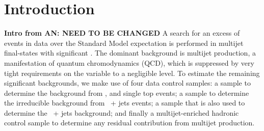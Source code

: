 \clearpage
\section{Introduction\label{sec:intro}}


%
\textbf{Intro from AN: NEED TO BE CHANGED}
A search for an excess of events in data over the Standard Model
expectation is performed in multijet final-states with significant
\met. The dominant background is multijet production, a manifestation
of quantum chromodynamics (QCD), which is suppressed by very tight
requirements on the \alphat variable to a negligible level. To
estimate the remaining significant backgrounds, we make use of four
data control samples: a \mj sample to determine the background from
\wj, \ttbar and single top events; a \gj sample to determine the
irreducible background from \znunu\ + jets events; a \mmj sample that
is also used to determine the \znunu\ + jets background; and finally a
multijet-enriched hadronic control sample to determine any residual
contribution from multijet production.

